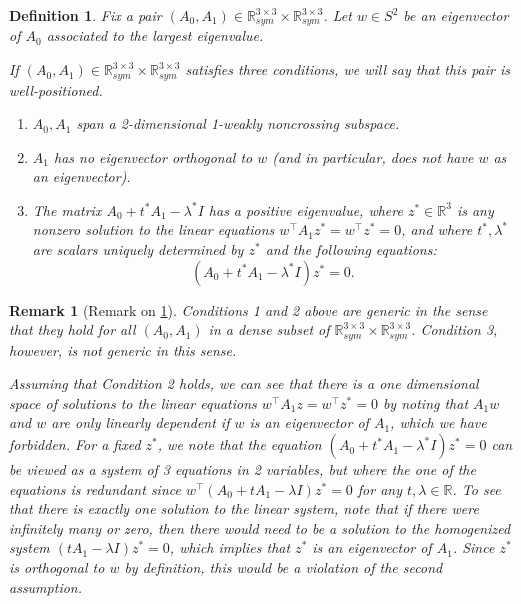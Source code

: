 \documentclass{article}
\numberwithin{equation}{section}
\newcommand{\R}{\mathbb{R}}
\newtheorem{definition}{Definition}[section]
\newtheorem{remark}{Remark}
\begin{document}
\begin{definition}\label{def:well-positioned}
Fix a pair $(A_0,A_1) \in \R^{3\times 3}_{sym} \times \R^{3\times 3}_{sym}$.
Let $w \in S^{2}$ be an
eigenvector of $A_0$ associated to the largest eigenvalue.

If $(A_0, A_1) \in \R^{3\times 3}_{sym} \times \R^{3\times 3}_{sym}$ %
satisfies three
conditions, we will say that this pair is \emph{well-positioned}.
\begin{enumerate}
    \item $A_0,A_1$ span a 2-dimensional 1-weakly noncrossing subspace.
    \item $A_1$ has no eigenvector orthogonal to $w$ (and in particular, does not have $w$ as an eigenvector).
    \item
    The matrix $A_0 + t^* A_1 - \lambda^* I$ has a positive eigenvalue, where
    $z^* \in \R^3$ is any nonzero solution to the linear equations $w^{\intercal} A_1z^* = w^{\intercal}z^* = 0$,
    and where  $t^*, \lambda^*$ are scalars uniquely determined by $z^*$ and the following equations:
    \[
        (A_0 + t^* A_1 - \lambda^* I)z^* = 0.  
    \]
\end{enumerate}
\end{definition}
\begin{remark}[Remark on \cref{def:well-positioned}]
    Conditions 1 and 2 above are generic in the sense that they hold for all $(A_0, A_1)$ in a dense subset of $\R^{3\times 3}_{sym} \times \R^{3\times 3}_{sym}$.
    Condition 3, however, is not generic in this sense.

    Assuming that  Condition 2 holds, we can see that there is a one dimensional space of solutions to the linear equations $w^{\intercal} A_1z = w^{\intercal}z^* = 0$ by noting that $A_1 w$ and $w$ are only linearly dependent if $w$ is an eigenvector of $A_1$, which we have forbidden. For a fixed $z^*$, we note that the equation $(A_0 + t^* A_1 - \lambda^* I)z^* = 0$ can be viewed as a system of 3 equations in 2 variables, but where the one of the equations is redundant since $w^{\intercal}(A_0 + t A_1 - \lambda I)z^* = 0$ for any $t, \lambda \in \R$. To see that there is exactly one solution to the linear system, note that if there were infinitely many or zero, then there would need to be a solution to the homogenized system $(t A_1 - \lambda I)z^* = 0$, which implies that $z^*$ is an eigenvector of $A_1$. Since $z^*$ is orthogonal to $w$ by definition, this would be a violation of the second assumption.
\end{remark}
\end{document}
